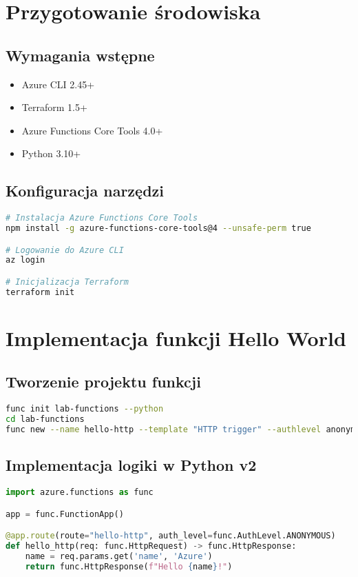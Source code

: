 \documentclass{article}
\begin{document}
\section{Przygotowanie środowiska}
\subsection{Wymagania wstępne}
\begin{itemize}
\item Azure CLI 2.45+
\item Terraform 1.5+
\item Azure Functions Core Tools 4.0+
\item Python 3.10+
\end{itemize}

\subsection{Konfiguracja narzędzi}
\begin{lstlisting}[language=bash]
# Instalacja Azure Functions Core Tools
npm install -g azure-functions-core-tools@4 --unsafe-perm true

# Logowanie do Azure CLI
az login

# Inicjalizacja Terraform
terraform init
\end{lstlisting}

\section{Implementacja funkcji Hello World}
\subsection{Tworzenie projektu funkcji}
\begin{lstlisting}[language=bash]
func init lab-functions --python
cd lab-functions
func new --name hello-http --template "HTTP trigger" --authlevel anonymous
\end{lstlisting}

\subsection{Implementacja logiki w Python v2}
\begin{lstlisting}[language=python]
import azure.functions as func

app = func.FunctionApp()

@app.route(route="hello-http", auth_level=func.AuthLevel.ANONYMOUS)
def hello_http(req: func.HttpRequest) -> func.HttpResponse:
    name = req.params.get('name', 'Azure')
    return func.HttpResponse(f"Hello {name}!")
\end{lstlisting}
\end{document}
